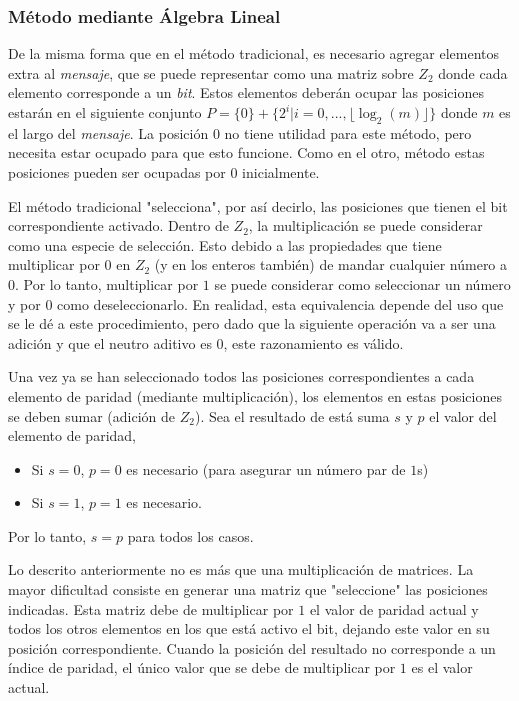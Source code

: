 \documentclass{article}
\begin{document}
\subsubsection{Método mediante Álgebra Lineal}

De la misma forma que en el método tradicional, es necesario agregar elementos extra al \textit{mensaje}, que se puede representar como una matriz sobre $Z_2$ donde cada elemento corresponde a un \textit{bit}. Estos elementos deberán ocupar las posiciones estarán en el siguiente conjunto  $ P = \{0\} + \{ 2^i | i={0, ..., \lfloor\log_2 (m)\rfloor} \} $ donde $m$ es el largo del \textit{mensaje}. La posición $0$ no tiene utilidad para este método, pero necesita estar ocupado para que esto funcione. Como en el otro, método estas posiciones pueden ser ocupadas por 0 inicialmente.

El método tradicional "selecciona", por así decirlo, las posiciones que tienen el bit correspondiente activado. Dentro de $Z_2$, la multiplicación se puede considerar como una especie de selección. Esto debido a las propiedades que tiene multiplicar por $0$ en $Z_2$ (y en los enteros también) de mandar cualquier número a $0$. Por lo tanto, multiplicar por $1$ se puede considerar como seleccionar un número y por $0$ como deseleccionarlo. En realidad, esta equivalencia depende del uso que se le dé a este procedimiento, pero dado que la siguiente operación va a ser una adición y que el neutro aditivo es $0$, este razonamiento es válido.

Una vez ya se han seleccionado todos las posiciones correspondientes a cada elemento de paridad (mediante multiplicación), los elementos en estas posiciones se deben sumar (adición de $Z_2$). Sea el resultado de está suma $s$ y $p$ el valor del elemento de paridad,
\begin{itemize}
    \item Si $s = 0$, $p = 0$ es necesario (para asegurar un número par de $1$s)
    \item Si $s = 1$, $p = 1$ es necesario.
\end{itemize}
Por lo tanto, $s = p$ para todos los casos. 

Lo descrito anteriormente no es más que una multiplicación de matrices. La mayor dificultad consiste en generar una matriz que "seleccione" las posiciones indicadas. Esta matriz debe de multiplicar por $1$ el valor de paridad actual y todos los otros elementos en los que está activo el bit, dejando este valor en su posición correspondiente. Cuando la posición del resultado no corresponde a un índice de paridad, el único valor que se debe de multiplicar por $1$ es el valor actual.
\end{document}
